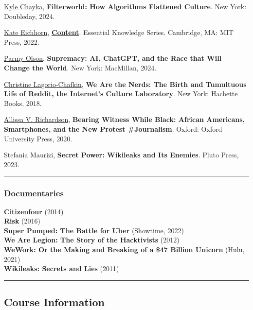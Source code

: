 \documentclass[
  letterpaper,
  DIV=11,
  numbers=noendperiod,
  oneside]{scrartcl}
\begin{document}
\href{https://www.kylechayka.com/}{Kyle Chayka}, \textbf{Filterworld:
How Algorithms Flattened Culture}. New York: Doubleday, 2024.

\href{https://emerson.edu/faculty-staff-directory/kate-eichhorn}{Kate
Eichhorn},
\href{https://mitpress.mit.edu/9780262543286/content/}{\textbf{Content}}.
Essential Knowledge Series. Cambridge, MA: MIT Press, 2022.

\href{https://x.com/parmy}{Parmy Olson}, \textbf{Supremacy: AI, ChatGPT,
and the Race that Will Change the World}. New York: MacMillan, 2024.

\href{https://x.com/lagorio}{Christine Lagorio-Chafkin}, \textbf{We Are
the Nerds: The Birth and Tumultuous Life of Reddit, the Internet's
Culture Laboratory}. New York: Hachette Books, 2018.

\href{https://allissavrichardson.com}{Allissa V. Richardson},
\textbf{Bearing Witness While Black: African Americans, Smartphones, and
the New Protest \#Journalism}. Oxford: Oxford University Press, 2020.

Stefania Maurizi, \textbf{Secret Power: Wikileaks and Its Enemies}.
Pluto Press, 2023.

\begin{center}\rule{0.5\linewidth}{0.5pt}\end{center}

\subsubsection{Documentaries}\label{documentaries}

\textbf{Citizenfour} (2014)\\
\textbf{Risk} (2016)\\
\textbf{Super Pumped: The Battle for Uber} (Showtime, 2022)\\
\textbf{We Are Legion: The Story of the Hacktivists} (2012)\\
\textbf{WeWork: Or the Making and Breaking of a \$47 Billion Unicorn}
(Hulu, 2021)\\
\textbf{Wikileaks: Secrets and Lies} (2011)\\

\begin{center}\rule{0.5\linewidth}{0.5pt}\end{center}

\subsection{Course Information}\label{course-information}
\end{document}

